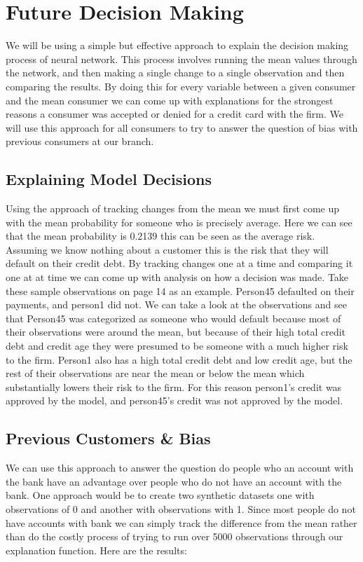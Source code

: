 \documentclass[12pt]{article}
\begin{document}
	
	\section{Future Decision Making}
	
	We will be using a simple but effective approach to explain the decision making process of neural network. This process involves running the mean values through the network, and then making a single change to a single observation and then comparing the results. By doing this for every variable between a given consumer and the mean consumer we can come up with explanations for the strongest reasons a consumer was accepted or denied for a credit card with the firm. We will use this approach for all consumers to try to answer the question of bias with previous consumers at our branch. 
	

	\subsection{Explaining Model Decisions}
	Using the approach of tracking changes from the mean we must first come up with the mean probability for someone who is precisely average. Here we can see that the mean probability is 0.2139 this can be seen as the average risk. Assuming we know nothing about a customer this is the risk that they will default on their credit debt. By tracking changes one at a time and comparing it one at at time we can come up with analysis on how a decision was made. Take these sample observations on page 14 as an example.
	 Person45 defaulted on their payments, and person1 did not. We can take a look at the observations and see that Person45 was categorized as someone who would default because most of their observations were around the mean, but because of their high total credit debt and credit age they were presumed to be someone with a much higher risk to the firm. 
	 Person1 also has a high total credit debt and low credit age, but the rest of their observations are near the mean or below the mean which substantially lowers their risk to the firm. For this reason person1's credit was approved by the model, and person45's credit was not approved by the model. 
	
	
	
	\subsection{Previous Customers \& Bias}
	
	We can use this approach to answer the question do people who an account with the bank have an advantage over people who do not have an account with the bank. One approach would be to create two synthetic datasets one with observations of 0 and another with observations with 1. Since most people do not have accounts with bank we can simply track the difference from the mean rather than do the costly process of trying to run over 5000 observations through our explanation function. Here are the results: 
	
\end{document}
